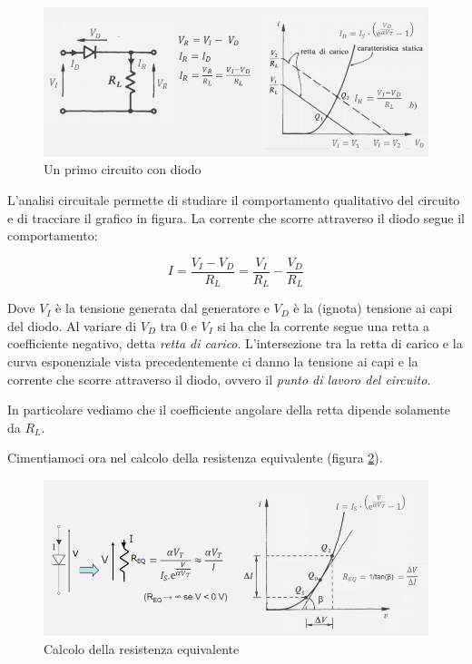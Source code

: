 \documentclass{article}
\begin{document}
\begin{figure}[h]
  \centering
  \includegraphics[scale=0.7]{IM_analisi_diodo}
  \caption{Un primo circuito con diodo}
  \label{Schema_analisi_diodo}
\end{figure}

L'analisi circuitale permette di studiare il comportamento qualitativo del circuito e di tracciare il grafico in figura. La corrente che scorre attraverso il diodo segue il comportamento:

\[I = \frac {V_I - V_D}{R_L} = \frac {V_I}{R_L} - \frac {V_D}{R_L}\]

Dove $V_I$ è la tensione generata dal generatore e $V_D$ è la (ignota) tensione ai capi del diodo. Al variare di $V_D$ tra $0$ e $V_I$ si ha che la corrente segue una retta a coefficiente negativo, detta \textit{retta di carico}. L'intersezione tra la retta di carico e la curva esponenziale vista precedentemente ci danno la tensione ai capi e la corrente che scorre attraverso il diodo, ovvero il \textit{punto di lavoro del circuito}.

In particolare vediamo che il coefficiente angolare della retta dipende solamente da $R_L$.

\vspace{3mm}

Cimentiamoci ora nel calcolo della resistenza equivalente (figura \ref{Schema_diodo_resistenza_equivalente}).

\begin{figure}[h]
  \centering
  \includegraphics[scale=0.6]{IM_diodo_resistenza_equivalente}
  \caption{Calcolo della resistenza equivalente}
  \label{Schema_diodo_resistenza_equivalente}
\end{figure}
\end{document}
